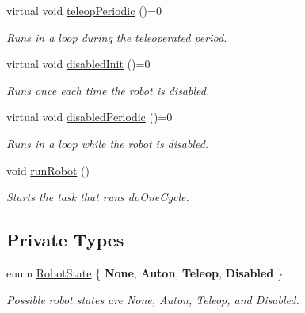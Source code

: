 \begin{DoxyCompactItemize}
\mbox{\label{classlib_iterative_robot_1_1_robot_base_a28b9b030381651797707e4690cfafc85}} 
virtual void \mbox{\hyperlink{classlib_iterative_robot_1_1_robot_base_a28b9b030381651797707e4690cfafc85}{teleop\+Periodic}} ()=0
\begin{DoxyCompactList}\small\item\em Runs in a loop during the teleoperated period. \end{DoxyCompactList}\item 
\mbox{\label{classlib_iterative_robot_1_1_robot_base_adfb0d0e1e5946827aedd2b97ac155351}} 
virtual void \mbox{\hyperlink{classlib_iterative_robot_1_1_robot_base_adfb0d0e1e5946827aedd2b97ac155351}{disabled\+Init}} ()=0
\begin{DoxyCompactList}\small\item\em Runs once each time the robot is disabled. \end{DoxyCompactList}\item 
\mbox{\label{classlib_iterative_robot_1_1_robot_base_adb4f513ca592875418dcc032f392404a}} 
virtual void \mbox{\hyperlink{classlib_iterative_robot_1_1_robot_base_adb4f513ca592875418dcc032f392404a}{disabled\+Periodic}} ()=0
\begin{DoxyCompactList}\small\item\em Runs in a loop while the robot is disabled. \end{DoxyCompactList}\item 
\mbox{\label{classlib_iterative_robot_1_1_robot_base_a508d3e112f7344da4c7ef72d30758b25}} 
void \mbox{\hyperlink{classlib_iterative_robot_1_1_robot_base_a508d3e112f7344da4c7ef72d30758b25}{run\+Robot}} ()
\begin{DoxyCompactList}\small\item\em Starts the task that runs do\+One\+Cycle. \end{DoxyCompactList}\end{DoxyCompactItemize}
\subsection*{Private Types}
\begin{DoxyCompactItemize}
\item 
\mbox{\label{classlib_iterative_robot_1_1_robot_base_a4a63ae91c048bc2f371b175527b3a461}} 
enum \mbox{\hyperlink{classlib_iterative_robot_1_1_robot_base_a4a63ae91c048bc2f371b175527b3a461}{Robot\+State}} \{ {\bfseries None}, 
{\bfseries Auton}, 
{\bfseries Teleop}, 
{\bfseries Disabled}
 \}
\begin{DoxyCompactList}\small\item\em Possible robot states are None, Auton, Teleop, and Disabled. \end{DoxyCompactList}\end{DoxyCompactItemize}

